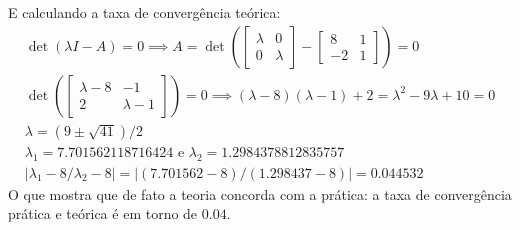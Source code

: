\documentclass[a4paper,11pt]{article}
\begin{document}
\begin{enumerate}[label=\textbf{(\alph*)}]
        E calculando a taxa de convergência teórica:
        $$
        \begin{matrix}
            \det(\lambda I - A) = 0 \implies A = \det \left (
            \begin{bmatrix}
                \lambda & 0 \\
                0 & \lambda
            \end{bmatrix}
            -
            \begin{bmatrix}
                8 & 1 \\
                -2 & 1
            \end{bmatrix}
            \right ) = 0
            \\
            \det \left (
            \begin{bmatrix}
                \lambda - 8 & -1 \\
                2 & \lambda - 1
            \end{bmatrix} 
            \right ) = 0
            \implies (\lambda - 8)(\lambda - 1) + 2 = \lambda^2 - 9 \lambda + 10 = 0
            \\
            \lambda = (9 \pm \sqrt{41})/2
            \\
            \lambda_1 = 7.701562118716424 \text{ e } \lambda_2 = 1.2984378812835757
            \\
            |\lambda_1 - 8/\lambda_2 - 8| = |(7.701562-8)/(1.298437-8)| = 0.044532
        \end{matrix}
        $$
        O que mostra que de fato a teoria concorda com a prática: a taxa de convergência prática e teórica é em torno de $0.04$.
            
       \end{enumerate}
       
\end{document}
